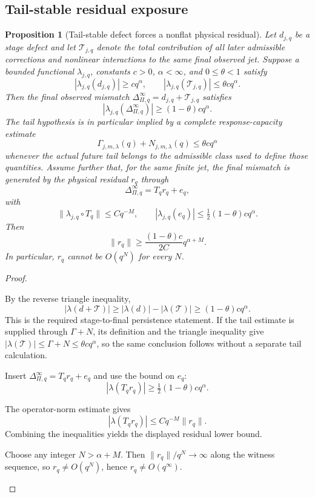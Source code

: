 \documentclass[12pt]{article}
\theoremstyle{plain}
\newtheorem{proposition}[theorem]{Proposition}
\theoremstyle{definition}
\theoremstyle{remark}
\newcommand{\Obs}{\Pi}
\newcommand{\Tail}{\mathscr T}
\begin{document}
\subsection{Tail-stable residual exposure}
\begin{proposition}[Tail-stable defect forces a nonflat physical residual]\label{prop:residual}
Let \(d_{j,q}\) be a stage defect and let \(\Tail_{j,q}\) denote the total contribution of all later admissible corrections and nonlinear interactions to the same final observed jet. Suppose a bounded functional \(\lambda_{j,q}\), constants \(c>0\), \(\alpha<\infty\), and \(0\le\theta<1\) satisfy
\[
|\lambda_{j,q}(d_{j,q})|\ge cq^\alpha,
\qquad
|\lambda_{j,q}(\Tail_{j,q})|\le\theta cq^\alpha.
\]
Then the final observed mismatch \(\Delta^{\infty}_{\Obs,q}=d_{j,q}+\Tail_{j,q}\) satisfies
\[
|\lambda_{j,q}(\Delta^{\infty}_{\Obs,q})|
\ge(1-\theta)cq^\alpha.
\]
The tail hypothesis is in particular implied by a complete response-capacity estimate
\[
\Gamma_{j,m,\lambda}(q)+N_{j,m,\lambda}(q)\le\theta c q^\alpha
\]
whenever the actual future tail belongs to the admissible class used to define those quantities. Assume further that, for the same finite jet, the final mismatch is generated by the physical residual \(r_q\) through
\[
\Delta^{\infty}_{\Obs,q}=T_qr_q+e_q,
\]
with
\[
\|\lambda_{j,q}\circ T_q\|\le Cq^{-M},
\qquad
|\lambda_{j,q}(e_q)|\le\tfrac12(1-\theta)cq^\alpha.
\]
Then
\[
\boxed{\|r_q\|\ge \frac{(1-\theta)c}{2C}q^{\alpha+M}.}
\]
In particular, \(r_q\) cannot be \(O(q^N)\) for every \(N\).
\end{proposition}

\begin{proof}
\begin{prooflines}
\item By the reverse triangle inequality,
\[
|\lambda(d+\Tail)|\ge|\lambda(d)|-|\lambda(\Tail)|
\ge(1-\theta)cq^\alpha.
\]
This is the required stage-to-final persistence statement. If the tail estimate is supplied through \(\Gamma+N\), its definition and the triangle inequality give \( |\lambda(\Tail)|\le\Gamma+N\le\theta c q^\alpha\), so the same conclusion follows without a separate tail calculation.
\item Insert \(\Delta^{\infty}_{\Obs,q}=T_qr_q+e_q\) and use the bound on \(e_q\):
\[
|\lambda(T_qr_q)|
\ge\tfrac12(1-\theta)cq^\alpha.
\]
\item The operator-norm estimate gives
\[
|\lambda(T_qr_q)|\le Cq^{-M}\|r_q\|.
\]
Combining the inequalities yields the displayed residual lower bound.
\item Choose any integer \(N>\alpha+M\). Then \(\|r_q\|/q^N\to\infty\) along the witness sequence, so \(r_q\neq O(q^N)\), hence \(r_q\neq O(q^\infty)\).
\end{prooflines}
\end{proof}
\end{document}
